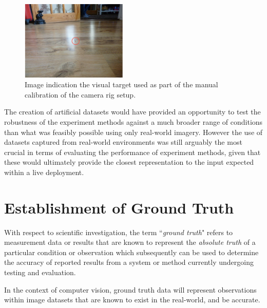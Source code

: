 \begin{figure}
  \begin{center}
    \includegraphics[width=0.45\textwidth]{images/cam_target.png}
  \end{center}
  \vspace{-10pt}
  \caption{Image indication the visual target used as part of the manual calibration of the camera rig setup.}
  \label{fig:target}
  \vspace{-20pt}
\end{figure}

The creation of artificial datasets would have provided an opportunity to test the robustness of the experiment methods against a much broader range of conditions than what was feasibly possible using only real-world imagery. However the use of datasets captured from real-world environments was still arguably the most crucial in terms of evaluating the performance of experiment methods, given that these would ultimately provide the closest representation to the input expected within a live deployment. 
%

\section{Establishment of Ground Truth}

With respect to scientific investigation, the term ``\textit{ground truth}" refers to measurement data or results that are known to represent the \textit{absolute truth} of a particular condition or observation which subsequently can be used to determine the accuracy of reported results from a system or method currently undergoing testing and evaluation.

In the context of computer vision, ground truth data will represent observations within image datasets that are known to exist in the real-world, and be accurate.

